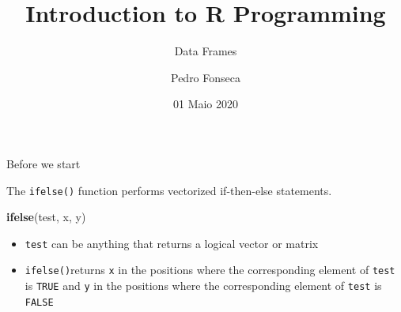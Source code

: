 \documentclass[ignorenonframetext,]{beamer}
\title{Introduction to R Programming}
\subtitle{Data Frames}
\author{Pedro Fonseca}
\date{01 Maio 2020}
\newenvironment{Shaded}{\begin{snugshade}}{\end{snugshade}}
\newcommand{\KeywordTok}[1]{\textcolor[rgb]{0.13,0.29,0.53}{\textbf{#1}}}
\newcommand{\NormalTok}[1]{#1}
\begin{document}
\frame{\titlepage}

\begin{frame}[fragile]{Before we start}
\protect\hypertarget{before-we-start}{}

The \texttt{ifelse()} function performs vectorized if-then-else
statements.

\begin{Shaded}
\begin{Highlighting}[]
\KeywordTok{ifelse}\NormalTok{(test, x, y)}
\end{Highlighting}
\end{Shaded}

\begin{itemize}
\item
  \texttt{test} can be anything that returns a logical vector or matrix
\item
  \texttt{ifelse()}returns \texttt{x} in the positions where the
  corresponding element of \texttt{test} is \texttt{TRUE} and \texttt{y}
  in the positions where the corresponding element of \texttt{test} is
  \texttt{FALSE}
\end{itemize}

\end{frame}
\end{document}
